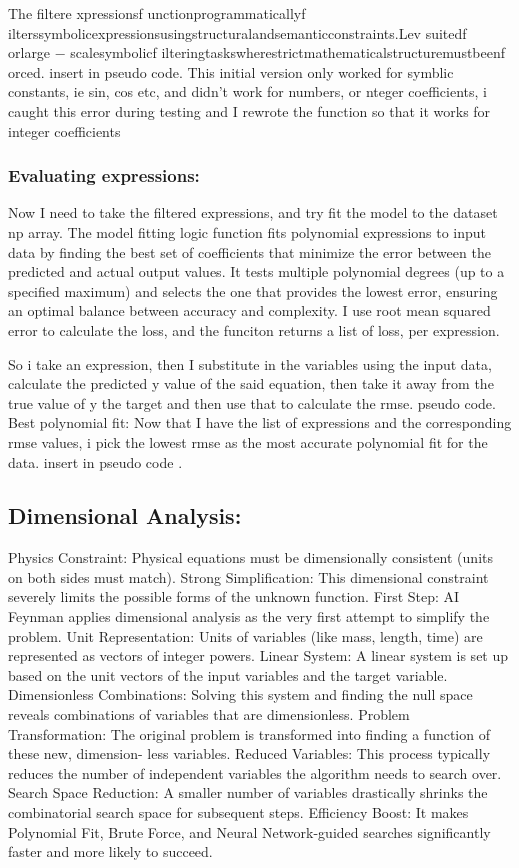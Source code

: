 \documentclass{article}
\begin{document}
The filtere xpressionsf unctionprogrammaticallyf ilterssymbolicexpressionsusingstructuralandsemanticconstraints.Lev
suitedf orlarge − scalesymbolicf ilteringtaskswherestrictmathematicalstructuremustbeenf orced.
insert in pseudo code.
This initial version only worked for symblic constants, ie sin, cos etc, and didn’t work for numbers, or nteger
coefficients, i caught this error during testing and I rewrote the function so that it works for integer coefficients


\subsubsection{Evaluating expressions:}

Now I need to take the filtered expressions, and try fit the model to the dataset np array. The model fitting
logic function fits polynomial expressions to input data by finding the best set of coefficients that minimize the
error between the predicted and actual output values. It tests multiple polynomial degrees (up to a specified
maximum) and selects the one that provides the lowest error, ensuring an optimal balance between accuracy
and complexity.
I use root mean squared error to calculate the loss, and the funciton returns a list of loss, per expression. 

So i take an expression, then I substitute in the variables using the input data, calculate the predicted y value of
the said equation, then take it away from the true value of y the target and then use that to calculate the rmse.
pseudo code.
Best polynomial fit:
Now that I have the list of expressions and the corresponding rmse values, i pick the lowest rmse as the most
accurate polynomial fit for the data.
insert in pseudo code . 


\subsection{Dimensional Analysis: }

Physics Constraint: Physical equations must be dimensionally consistent (units on both sides must match).
Strong Simplification: This dimensional constraint severely limits the possible forms of the unknown function.
First Step: AI Feynman applies dimensional analysis as the very first attempt to simplify the problem.
Unit Representation: Units of variables (like mass, length, time) are represented as vectors of integer powers.
Linear System: A linear system is set up based on the unit vectors of the input variables and the target variable.
Dimensionless Combinations: Solving this system and finding the null space reveals combinations of variables
that are dimensionless.
Problem Transformation: The original problem is transformed into finding a function of these new, dimension-
less variables.
Reduced Variables: This process typically reduces the number of independent variables the algorithm needs to
search over.
Search Space Reduction: A smaller number of variables drastically shrinks the combinatorial search space for
subsequent steps.
Efficiency Boost: It makes Polynomial Fit, Brute Force, and Neural Network-guided searches significantly
faster and more likely to succeed. 
\end{document}
